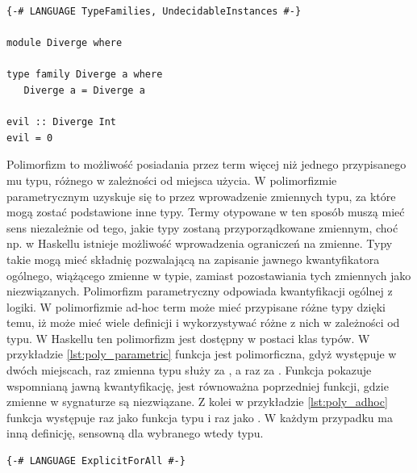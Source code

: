{\begin{lstlisting}[float,label={lst:types_diverge},
                   caption={Przykład programu, dla którego statyczne sprawdzanie typów w GHC się nie zakończy.}]
{-# LANGUAGE TypeFamilies, UndecidableInstances #-}

module Diverge where

type family Diverge a where
   Diverge a = Diverge a

evil :: Diverge Int
evil = 0
\end{lstlisting}


Polimorfizm to możliwość posiadania przez term więcej niż jednego przypisanego
mu typu, różnego w zależności od miejsca użycia. W polimorfizmie parametrycznym
uzyskuje się to przez wprowadzenie zmiennych typu, za które mogą zostać
podstawione inne typy. Termy otypowane w ten sposób muszą mieć sens niezależnie
od tego, jakie typy zostaną przyporządkowane zmiennym, choć np. w Haskellu
istnieje możliwość wprowadzenia ograniczeń na zmienne. Typy takie mogą mieć
składnię pozwalającą na zapisanie jawnego kwantyfikatora ogólnego, wiążącego
zmienne w typie, zamiast pozostawiania tych zmiennych jako
niezwiązanych. Polimorfizm parametryczny odpowiada kwantyfikacji ogólnej z
logiki. W polimorfizmie ad-hoc term może mieć przypisane różne typy dzięki temu,
iż może mieć wiele definicji i wykorzystywać różne z nich w zależności od
typu. W Haskellu ten polimorfizm jest dostępny w postaci klas
typów\cite{TAPL}. W przykładzie \ref{lst:poly_parametric} funkcja 
jest polimorficzna, gdyż występuje w dwóch miejscach, raz zmienna typu 
służy za , a raz za . Funkcja  pokazuje
wspomnianą jawną kwantyfikację, jest równoważna poprzedniej funkcji, gdzie
zmienne w sygnaturze są niezwiązane. Z kolei w przykładzie \ref{lst:poly_adhoc}
funkcja  występuje raz jako funkcja typu  i raz jako
. W każdym przypadku ma inną definicję, sensowną dla
wybranego wtedy typu.

\begin{lstlisting}[float,label={lst:poly_parametric},
                   caption={Przykład użycia polimorfizmu parametrycznego w Haskellu.}]
{-# LANGUAGE ExplicitForAll #-}


\end{lstlisting}}
